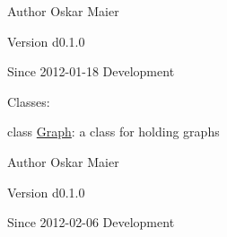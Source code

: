 \begin{DoxyAuthor}{Author}
Oskar Maier 
\end{DoxyAuthor}
\begin{DoxyVersion}{Version}
d0.1.0 
\end{DoxyVersion}
\begin{DoxySince}{Since}
2012-\/01-\/18  Development
\end{DoxySince}
Classes:
\begin{DoxyItemize}
\item class \hyperlink{classmedpy_1_1graphcut_1_1graph_1_1Graph}{Graph}: a class for holding graphs
\end{DoxyItemize}

\begin{DoxyAuthor}{Author}
Oskar Maier 
\end{DoxyAuthor}
\begin{DoxyVersion}{Version}
d0.1.0 
\end{DoxyVersion}
\begin{DoxySince}{Since}
2012-\/02-\/06  Development 
\end{DoxySince}
